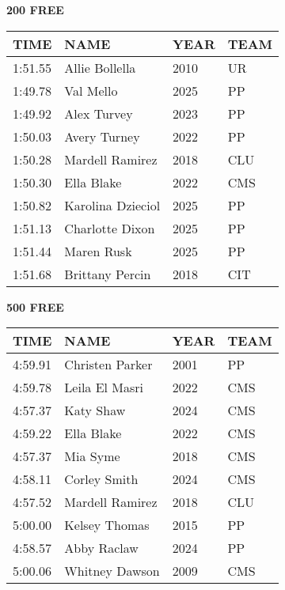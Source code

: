 \vspace{0.4cm}

\begin{minipage}[t]{0.48\textwidth}
\centering
\textbf{200 FREE}\\[0.05cm]
\begin{tabular}{@{}p{1.8cm}p{2.8cm}p{1.2cm}p{1.4cm}@{}}
\hline
\textbf{TIME} & \textbf{NAME} & \textbf{YEAR} & \textbf{TEAM} \\
\hline
1:51.55 & Allie Bollella & 2010 & UR \\
1:49.78 & Val Mello & 2025 & PP \\
1:49.92 & Alex Turvey & 2023 & PP \\
1:50.03 & Avery Turney & 2022 & PP \\
1:50.28 & Mardell Ramirez & 2018 & CLU \\
1:50.30 & Ella Blake & 2022 & CMS \\
1:50.82 & Karolina Dzieciol & 2025 & PP \\
1:51.13 & Charlotte Dixon & 2025 & PP \\
1:51.44 & Maren Rusk & 2025 & PP \\
1:51.68 & Brittany Percin & 2018 & CIT \\
\hline
\end{tabular}
\end{minipage}\hfill
\begin{minipage}[t]{0.48\textwidth}
\centering
\textbf{500 FREE}\\[0.05cm]
\begin{tabular}{@{}p{1.8cm}p{2.8cm}p{1.2cm}p{1.4cm}@{}}
\hline
\textbf{TIME} & \textbf{NAME} & \textbf{YEAR} & \textbf{TEAM} \\
\hline
4:59.91 & Christen Parker & 2001 & PP \\
4:59.78 & Leila El Masri & 2022 & CMS \\
4:57.37 & Katy Shaw & 2024 & CMS \\
4:59.22 & Ella Blake & 2022 & CMS \\
4:57.37 & Mia Syme & 2018 & CMS \\
4:58.11 & Corley Smith & 2024 & CMS \\
4:57.52 & Mardell Ramirez & 2018 & CLU \\
5:00.00 & Kelsey Thomas & 2015 & PP \\
4:58.57 & Abby Raclaw & 2024 & PP \\
5:00.06 & Whitney Dawson & 2009 & CMS \\
\hline
\end{tabular}
\end{minipage}

